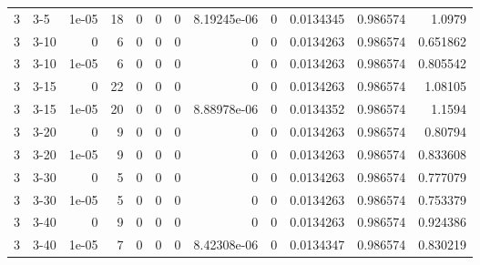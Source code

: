 \begin{tabular}{rlrrrrrrrrrr}
     3 & 3-5    &      1e-05 &          18 &                 0 &                 0 &     0           &     8.19245e-06 &      0           &        0.0134345 &               0.986574 &           1.0979   \\
     3 & 3-10   &      0     &           6 &                 0 &                 0 &     0           &     0           &      0           &        0.0134263 &               0.986574 &           0.651862 \\
     3 & 3-10   &      1e-05 &           6 &                 0 &                 0 &     0           &     0           &      0           &        0.0134263 &               0.986574 &           0.805542 \\
     3 & 3-15   &      0     &          22 &                 0 &                 0 &     0           &     0           &      0           &        0.0134263 &               0.986574 &           1.08105  \\
     3 & 3-15   &      1e-05 &          20 &                 0 &                 0 &     0           &     8.88978e-06 &      0           &        0.0134352 &               0.986574 &           1.1594   \\
     3 & 3-20   &      0     &           9 &                 0 &                 0 &     0           &     0           &      0           &        0.0134263 &               0.986574 &           0.80794  \\
     3 & 3-20   &      1e-05 &           9 &                 0 &                 0 &     0           &     0           &      0           &        0.0134263 &               0.986574 &           0.833608 \\
     3 & 3-30   &      0     &           5 &                 0 &                 0 &     0           &     0           &      0           &        0.0134263 &               0.986574 &           0.777079 \\
     3 & 3-30   &      1e-05 &           5 &                 0 &                 0 &     0           &     0           &      0           &        0.0134263 &               0.986574 &           0.753379 \\
     3 & 3-40   &      0     &           9 &                 0 &                 0 &     0           &     0           &      0           &        0.0134263 &               0.986574 &           0.924386 \\
     3 & 3-40   &      1e-05 &           7 &                 0 &                 0 &     0           &     8.42308e-06 &      0           &        0.0134347 &               0.986574 &           0.830219 \\

\end{tabular}
